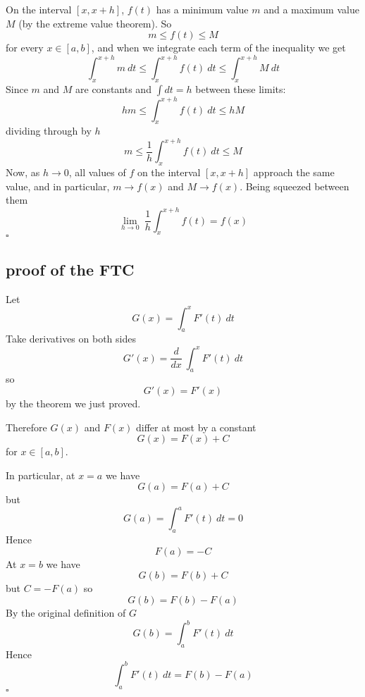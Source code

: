 \documentclass[11pt, oneside]{article}   	%
\begin{document}
On the interval $[x, x+h]$, $f(t)$ has a minimum value $m$ and a maximum value $M$ (by the extreme value theorem).  So
\[ m \le f(t) \le M \]
for every $x \in [a,b]$,
and when we integrate each term of the inequality we get
\[ \int_x^{x+h} m \ dt \le \int_x^{x+h} f(t) \ dt \le \int_x^{x+h} M \ dt \]
Since $m$ and $M$ are constants and $\int dt = h$ between these limits:
\[ hm \le \int_x^{x+h} f(t) \ dt \le hM \]
dividing through by $h$
\[ m \le \frac{1}{h} \int_x^{x+h} f(t) \ dt \le M \]
Now, as $h \rightarrow 0$, all values of $f$ on the interval $[x,x+h]$ approach the same value, and in particular, $m \rightarrow f(x)$ and $M \rightarrow f(x)$.  Being squeezed between them
\[ \lim_{h \rightarrow 0} \ \frac{1}{h} \int_x^{x+h} f(t) = f(x) \]
$\square$

\subsection*{proof of the FTC}
Let 
\[ G(x) = \int_a^x F'(t) \ dt \]
Take derivatives on both sides
\[ G'(x) = \frac{d}{dx} \ \int_a^x F'(t) \ dt \]
so
\[ G'(x) = F'(x) \]
by the theorem we just proved.

Therefore $G(x)$ and $F(x)$ differ at most by a constant
\[ G(x) = F(x) + C \]
for $x \in [a,b]$.

In particular, at $x = a$ we have
\[ G(a) = F(a) + C \]
but
\[ G(a) = \int_a^a F'(t) \ dt = 0 \]
Hence
\[ F(a) = - C \]
At $x = b$ we have
\[ G(b) = F(b) + C \]
but $C = - F(a)$
so
\[ G(b) = F(b) - F(a) \]
By the original definition of $G$
\[ G(b) = \int_a^b F'(t) \ dt \]
Hence
\[ \int_a^b F'(t) \ dt = F(b) - F(a) \]
$\square$
\end{document}
